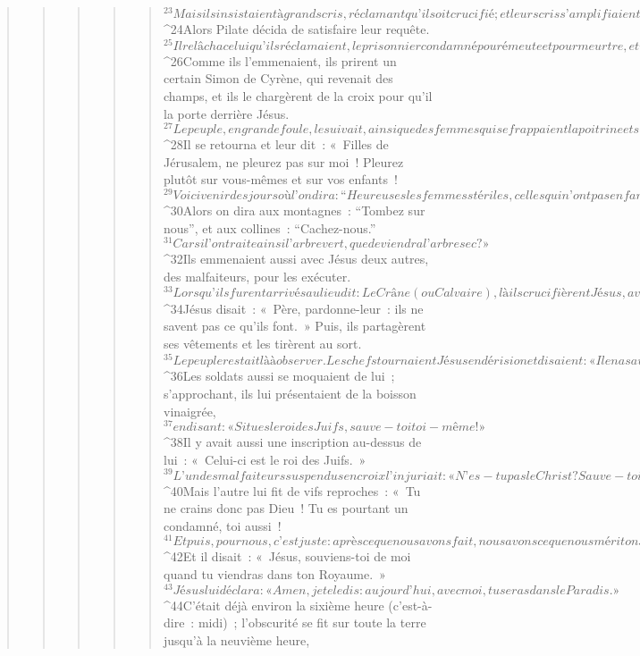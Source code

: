 \begin{verse}
\begin{verse}
\begin{verse}
\begin{verse}
\begin{verse}
${}^{23}Mais ils insistaient à grands cris, réclamant qu’il soit crucifié ; et leurs cris s’amplifiaient.
${}^{24}Alors Pilate décida de satisfaire leur requête. 
${}^{25}Il relâcha celui qu’ils réclamaient, le prisonnier condamné pour émeute et pour meurtre, et il livra Jésus à leur bon plaisir.
${}^{26}Comme ils l’emmenaient, ils prirent un certain Simon de Cyrène, qui revenait des champs, et ils le chargèrent de la croix pour qu’il la porte derrière Jésus.
${}^{27}Le peuple, en grande foule, le suivait, ainsi que des femmes qui se frappaient la poitrine et se lamentaient sur Jésus. 
${}^{28}Il se retourna et leur dit : « Filles de Jérusalem, ne pleurez pas sur moi ! Pleurez plutôt sur vous-mêmes et sur vos enfants ! 
${}^{29}Voici venir des jours où l’on dira : “Heureuses les femmes stériles, celles qui n’ont pas enfanté, celles qui n’ont pas allaité !” 
${}^{30}Alors on dira aux montagnes : “Tombez sur nous”, et aux collines : “Cachez-nous.” 
${}^{31}Car si l’on traite ainsi l’arbre vert, que deviendra l’arbre sec ? »
${}^{32}Ils emmenaient aussi avec Jésus deux autres, des malfaiteurs, pour les exécuter.
${}^{33}Lorsqu’ils furent arrivés au lieu dit : Le Crâne (ou Calvaire), là ils crucifièrent Jésus, avec les deux malfaiteurs, l’un à droite et l’autre à gauche. 
${}^{34}Jésus disait : « Père, pardonne-leur : ils ne savent pas ce qu’ils font. » Puis, ils partagèrent ses vêtements et les tirèrent au sort.
${}^{35}Le peuple restait là à observer. Les chefs tournaient Jésus en dérision et disaient : « Il en a sauvé d’autres : qu’il se sauve lui-même, s’il est le Messie de Dieu, l’Élu ! » 
${}^{36}Les soldats aussi se moquaient de lui ; s’approchant, ils lui présentaient de la boisson vinaigrée, 
${}^{37}en disant : « Si tu es le roi des Juifs, sauve-toi toi-même ! » 
${}^{38}Il y avait aussi une inscription au-dessus de lui :
      « Celui-ci est le roi des Juifs. »
${}^{39}L’un des malfaiteurs suspendus en croix l’injuriait : « N’es-tu pas le Christ ? Sauve-toi toi-même, et nous aussi ! » 
${}^{40}Mais l’autre lui fit de vifs reproches : « Tu ne crains donc pas Dieu ! Tu es pourtant un condamné, toi aussi ! 
${}^{41}Et puis, pour nous, c’est juste : après ce que nous avons fait, nous avons ce que nous méritons. Mais lui, il n’a rien fait de mal. » 
${}^{42}Et il disait : « Jésus, souviens-toi de moi quand tu viendras dans ton Royaume. » 
${}^{43}Jésus lui déclara : « Amen, je te le dis : aujourd’hui, avec moi, tu seras dans le Paradis. »
${}^{44}C’était déjà environ la sixième heure (c’est-à-dire : midi) ; l’obscurité se fit sur toute la terre jusqu’à la neuvième heure, 

\end{verse}
\end{verse}
\end{verse}
\end{verse}
\end{verse}
